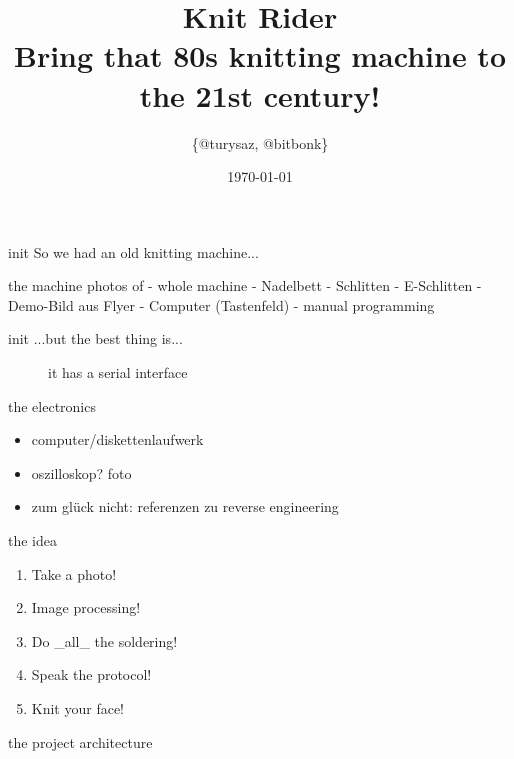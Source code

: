 \documentclass{beamer}
\author{\{@turysaz, @bitbonk\}}
\title{\Huge{Knit Rider}\\
    \large{Bring that 80s knitting machine to the 21st century!}
}
\date{\today{}}
\begin{document}
\maketitle


\begin{frame}{init}
      So we had an old knitting machine...
\end{frame}

\begin{frame}{the machine}
photos of
- whole machine
- Nadelbett
- Schlitten
- E-Schlitten
- Demo-Bild aus Flyer
- Computer (Tastenfeld)
- manual programming
\end{frame}

\begin{frame}{init}
    ...but the best thing is...\pause
    \begin{figure}
        \caption{it has a serial interface }
    \end{figure}
\end{frame}


\begin{frame}{the electronics}
    \begin{itemize}
        \item computer/diskettenlaufwerk
        \item oszilloskop? foto
        \item zum glück nicht: referenzen zu reverse engineering
    \end{itemize}
\end{frame}


\begin{frame}{the idea}
    \begin{enumerate}[<+->]
        \item Take a photo!
        \item Image processing!
        \item Do \_all\_ the soldering!
        \item Speak the protocol!
        \item Knit your face!
    \end{enumerate}
\end{frame}

\begin{frame}{the project architecture}
    \begin{figure}
    \end{figure}
\end{frame}
\end{document}
